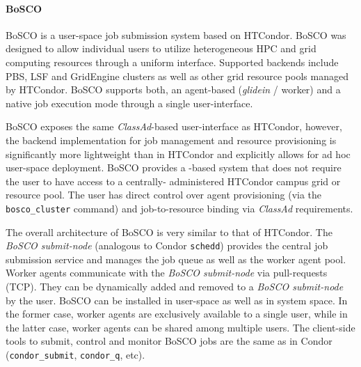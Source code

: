 \documentclass{sig-alternate}
\begin{document}
\paragraph{BoSCO}

BoSCO is a user-space job submission system based on HTCondor. BoSCO was
designed to allow individual users to utilize heterogeneous HPC and grid
computing resources through a uniform interface. Supported backends include
PBS, LSF and GridEngine clusters as well as other  grid resource pools managed
by HTCondor. BoSCO supports both, an agent-based (\textit{glidein} / worker)
and a native job execution mode through a single user-interface.

BoSCO exposes the same \textit{ClassAd}-based user-interface as HTCondor,
however, the backend implementation for job management and resource
provisioning is significantly more lightweight than in HTCondor and explicitly
allows for ad hoc user-space deployment. BoSCO provides a \pilotjob-based
system that does not require the user to have access to a centrally-
administered HTCondor campus grid or  resource pool. The user has direct
control over \pilotjob agent provisioning (via the \texttt{bosco\_cluster}
command) and job-to-resource binding via \textit{ClassAd} requirements.

The overall architecture of BoSCO is very similar to that of HTCondor. The
\textit{BoSCO submit-node} (analogous to Condor \texttt{schedd}) provides the
central job submission service and manages the job queue as well as the worker
agent pool. Worker agents communicate with the \textit{BoSCO submit-node} via
pull-requests (TCP). They can be dynamically added and removed to a
\textit{BoSCO submit-node} by the user. BoSCO can be installed in user-space
as well as in system space. In the former case, worker agents are exclusively
available to a single user, while in the latter case, worker agents can be
shared among multiple users. The client-side tools to submit, control and
monitor BoSCO jobs are the same as in Condor (\texttt{condor\_submit},
\texttt{condor\_q}, etc).


\end{document}
